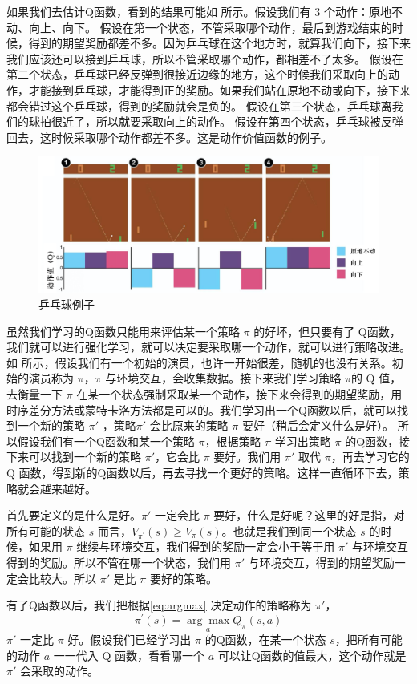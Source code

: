 如果我们去估计Q函数，看到的结果可能如 所示。假设我们有 3 个动作：原地不动、向上、向下。
假设在第一个状态，不管采取哪个动作，最后到游戏结束的时候，得到的期望奖励都差不多。因为乒乓球在这个地方时，就算我们向下，接下来我们应该还可以接到乒乓球，所以不管采取哪个动作，都相差不了太多。
假设在第二个状态，乒乓球已经反弹到很接近边缘的地方，这个时候我们采取向上的动作，才能接到乒乓球，才能得到正的奖励。如果我们站在原地不动或向下，接下来都会错过这个乒乓球，得到的奖励就会是负的。
假设在第三个状态，乒乓球离我们的球拍很近了，所以就要采取向上的动作。
假设在第四个状态，乒乓球被反弹回去，这时候采取哪个动作都差不多。这是动作价值函数的例子。
\begin{figure}[hbt]
    \centering
    \includegraphics[width=0.5\linewidth]{res/ch6/6.8}
    \caption{乒乓球例子}
    \label{fig:fig6.8}
\end{figure}

虽然我们学习的Q函数只能用来评估某一个策略 $\pi$ 的好坏，但只要有了 Q函数，我们就可以进行强化学习，就可以决定要采取哪一个动作，就可以进行策略改进。
如 所示，假设我们有一个初始的演员，也许一开始很差，随机的也没有关系。初始的演员称为 $\pi$，$\pi$ 与环境交互，会收集数据。接下来我们学习策略 $\pi$的 Q 值，去衡量一下 $\pi$ 在某一个状态强制采取某一个动作，接下来会得到的期望奖励，用时序差分方法或蒙特卡洛方法都是可以的。我们学习出一个Q函数以后，就可以找到一个新的策略 $\pi'$ ，策略$\pi'$ 会比原来的策略 $\pi$ 要好（稍后会定义什么是好）。
所以假设我们有一个Q函数和某一个策略 $\pi$，根据策略 $\pi$ 学习出策略 $\pi$ 的Q函数，接下来可以找到一个新的策略  $\pi'$，它会比 $\pi$ 要好。我们用 $\pi'$ 取代 $\pi$，再去学习它的 Q 函数，得到新的Q函数以后，再去寻找一个更好的策略。这样一直循环下去，策略就会越来越好。 

首先要定义的是什么是好。$\pi'$ 一定会比 $\pi$ 要好，什么是好呢？这里的好是指，对所有可能的状态 $s$ 而言，$V_{\pi^{\prime}}(s) \geqslant V_{\pi}(s)$。也就是我们到同一个状态 $s$ 的时候，如果用 $\pi$ 继续与环境交互，我们得到的奖励一定会小于等于用 $\pi'$ 与环境交互得到的奖励。所以不管在哪一个状态，我们用 $\pi'$ 与环境交互，得到的期望奖励一定会比较大。所以 $\pi'$ 是比 $\pi$  要好的策略。

有了Q函数以后，我们把根据\eqref{eq:argmax} 决定动作的策略称为 $\pi'$，
\begin{equation}
    \label{eq:argmax}
    \pi^{\prime}(s)=\underset{a}{\arg \max} Q_{\pi}(s, a)
\end{equation}
$\pi'$ 一定比 $\pi$ 好。假设我们已经学习出 $\pi$ 的Q函数，在某一个状态 $s$，把所有可能的动作 $a$ 一一代入 Q 函数，看看哪一个 $a$ 可以让Q函数的值最大，这个动作就是 $\pi'$ 会采取的动作。

